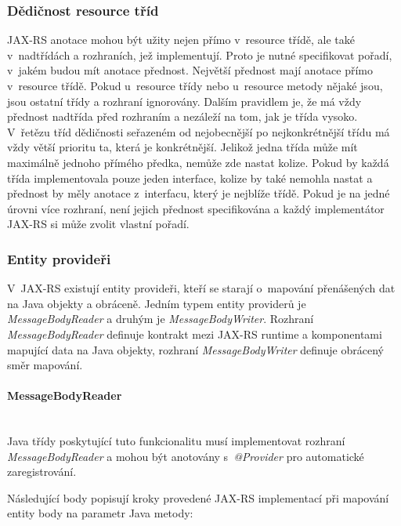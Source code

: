 \documentclass[11pt,twoside,a4paper]{book}
\begin{document}
\subsubsection{Dědičnost resource tříd}
\label{subsec:dedicnost-resource-trid}

JAX-RS anotace mohou být užity nejen přímo v~resource třídě, ale také
v~nadtřídách a rozhraních, jež implementují. Proto je nutné specifikovat pořadí,
v~jakém budou mít anotace přednost. Největší přednost mají anotace přímo
v~resource třídě. Pokud u~resource třídy nebo u~resource metody nějaké jsou, jsou
ostatní třídy a rozhraní ignorovány. Dalším pravidlem je, že má vždy přednost
nadtřída před rozhraním a nezáleží na tom, jak je třída vysoko. V~řetězu tříd
dědičnosti seřazeném od nejobecnější po nejkonkrétnější třídu má vždy
větší prioritu ta, která je konkrétnější. Jelikož jedna třída může mít maximálně
jednoho přímého předka, nemůže zde nastat kolize. Pokud by každá třída
implementovala pouze jeden interface, kolize by také nemohla nastat a přednost
by měly anotace z~interfacu, který je nejblíže třídě. Pokud je na jedné úrovni
více rozhraní, není jejich přednost specifikována a každý
implementátor JAX-RS si může zvolit vlastní pořadí.

\subsubsection{Entity provideři}
\label{subsec:entity-provideri}

V~JAX-RS existují entity provideři, kteří se starají o~mapování přenášených
dat na Java objekty a obráceně. Jedním typem entity providerů je {\em
MessageBodyReader} a druhým je {\em MessageBodyWriter}.  Rozhraní 
{\em MessageBodyReader} definuje kontrakt mezi JAX-RS runtime a komponentami
mapující data na Java objekty, rozhraní {\em MessageBodyWriter} definuje
obrácený směr mapování.

\paragraph{MessageBodyReader}
\label{par:messagebodyreader}
\mbox{}\\

Java třídy poskytující tuto funkcionalitu musí implementovat rozhraní
{\em MessageBodyReader} a mohou být anotovány s~{\em @Provider} pro automatické
zaregistrování.

Následující body popisují kroky provedené JAX-RS implementací při mapování
entity body na parametr Java metody:
\end{document}
